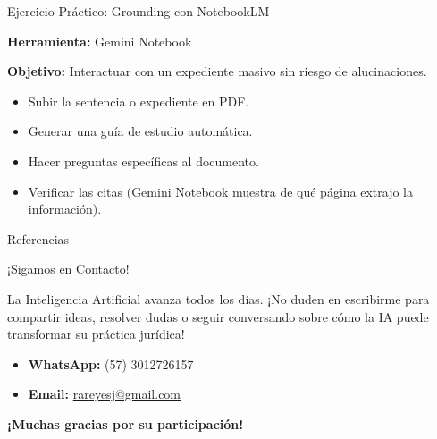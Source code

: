 \documentclass[aspectratio=169]{beamer}
\begin{document}
\begin{frame}[fragile]{Ejercicio Práctico: Grounding con NotebookLM}


\textbf{Herramienta:} Gemini Notebook \cite{notebooklm2024}

\textbf{Objetivo:} Interactuar con un expediente masivo sin riesgo de alucinaciones.

\begin{itemize}
  \item Subir la sentencia o expediente en PDF.
  \item Generar una guía de estudio automática.
  \item Hacer preguntas específicas al documento.
  \item Verificar las citas (Gemini Notebook muestra de qué página extrajo la información).
\end{itemize}
\end{frame}



\begin{frame}[allowframebreaks]{Referencias}
  
  
\end{frame}

\begin{frame}[fragile]{¡Sigamos en Contacto!}


La Inteligencia Artificial avanza todos los días. ¡No duden en escribirme para compartir ideas, resolver dudas o seguir conversando sobre cómo la IA puede transformar su práctica jurídica!

\begin{itemize}
  \item \textbf{WhatsApp:} (57) 3012726157
  \item \textbf{Email:} \href{mailto:rareyesj@gmail.com}{rareyesj@gmail.com}
\end{itemize}
\textbf{¡Muchas gracias por su participación!}
\end{frame}
\end{document}
